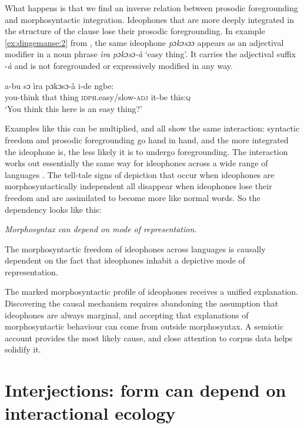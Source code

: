 \documentclass[output=paper]{langsci/langscibook}
\begin{document}
   What happens is that we find an inverse relation between prosodic foregrounding and morphosyntactic integration. Ideophones that are more deeply integrated in the structure of the clause lose their prosodic foregrounding. In example \ref{ex:dingemanse:2} from , the same ideophone \textit{pɔkɔsɔɔ} appears as an adjectival modifier in a noun phrase \textit{ìra pɔkɔsɔ-à} ‘easy thing’. It carries the adjectival suffix -\textit{à} and is not foregrounded or expressively modified in any way.

\ea \label{ex:dingemanse:2}
 \gll a-bu  sɔ  ìra  pɔkɔsɔ-à  i-de  ngbe:\\
 {{you-think}}  {{that}}  {{thing}}  \textsc{idph}.easy/slow-\textsc{adj}  {{it-be}}  {{this:}}{\textsc{q}}\\
\glt ‘You think this here is an easy thing?’
\z



    Examples like this can be multiplied, and all show the same interaction: syntactic freedom and prosodic foregrounding go hand in hand, and the more integrated the ideophone is, the less likely it is to undergo foregrounding. The interaction works out essentially the same way for ideophones across a wide range of languages \citep{Dingemanse2012}. The tell-tale signs of depiction that occur when ideophones are morphosyntactically independent all disappear when ideophones lose their freedom and are assimilated to become more like normal words. So the dependency looks like this:


\ea\textit{Morphosyntax can depend on mode of representation.} 

\textup{The morphosyntactic freedom of ideophones across languages is causally dependent on the fact that ideophones inhabit a depictive mode of representation.}
\z

   The marked morphosyntactic profile of ideophones receives a unified explanation. Discovering the causal mechanism requires abandoning the assumption that ideophones are always marginal, and accepting that explanations of morphosyntactic behaviour can come from outside morphosyntax. A semiotic account provides the most likely cause, and close attention to corpus data helps solidify it.


\section{Interjections: form can depend on interactional ecology}
\end{document}
